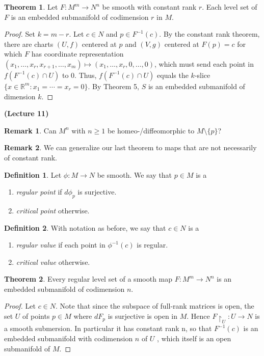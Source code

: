 \documentclass[10pt,letterpaper,cm]{nupset}
\theoremstyle{definition}
\newtheorem*{definition}{Definition}
\newtheorem{remark}{Remark}
\newtheorem{theorem}{Theorem}
\newcommand{\R}{\mathbb R}
\newcommand{\1}{\mathbf{1}}
\newcommand{\0}{\vec 0}
\begin{document}
\begin{theorem}
Let $F: M^m \to N^n$ be smooth with constant rank $r$. Each level set of $F$ is an embedded submanifold of codimension $r$ in $M$.
\end{theorem}
\begin{proof}
Set $k = m -r$. Let $c \in N$ and $p \in F^{-1}(c)$. By the constant rank theorem, there are charts $(U, f)$ centered at $p$ and $(V, g)$ centered at $F(p) = c$ for which $F$ has coordinate representation $(x_1, \ldots, x_r, x_{r+1}, \ldots, x_m) \mapsto (x_1, \ldots, x_r, 0, \ldots, 0)$, which must send each point in $f(F^{-1}(c) \cap U)$ to $0$.  Thus, $f(F^{-1}(c) \cap U)$ equals the $k$-slice $\{x \in \R^m : x_1 = \cdots = x_r = 0\}$. By Theorem 5, $S$ is an embedded submanifold of dimension $k$.
\end{proof}

\begin{center}
{\textbf{(Lecture 11)}} 
\end{center}

\begin{remark}
Can $M^n$ with $n\geq 1$ be homeo-/diffeomorphic to $M\setminus \{p\}$? 
\end{remark}

\begin{remark}
We can generalize our last theorem to maps that are not necessarily of constant rank.
\end{remark}

\begin{definition}
Let $\phi : M \to N$ be smooth. We say that $p\in M$ is a
\begin{enumerate}
\item \textit{regular point} if $d\phi_p$ is surjective.
\item  \textit{critical point} otherwise.
\end{enumerate}
\end{definition}

\begin{definition}
With notation as before, we say that $c \in N$ is a
\begin{enumerate}
\item  \textit{regular value} if each point in $\phi^{-1}(c)$ is regular.
\item  \textit{critical value} otherwise.
\end{enumerate}
\end{definition}

\begin{theorem}
Every regular level set of a smooth map $F: M^m \to N^n$ is an embedded submanifold of codimension $n$.
\end{theorem}
\begin{proof}
Let $c \in N$. Note that since the subspace of full-rank matrices is open, the set $U$ of points $p\in M$ where $dF_p$ is surjective is open in $M$. Hence $F\restriction_U : U \to N$ is a smooth submersion. In particular it has constant rank n, so that $F^{-1}(c)$ is an embedded submanifold with codimension $n$ of $U$ , which itself is an open submanifold of $M$.
\end{proof}
\end{document}
